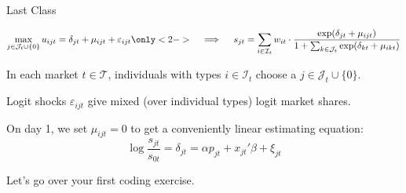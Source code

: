 \documentclass[aspectratio=169,t,11pt,table]{beamer}
\begin{document}

\begin{frame}{Last Class}
    \vspace{-\baselineskip}
    \begin{minipage}[c][4\baselineskip][c]{\textwidth}
        \begin{equation*}
            \max_{j \in \mathcal{J}_t \cup \{0\}} u_{ijt} = \delta_{jt} + \mu_{ijt} + \varepsilon_{ijt} \only<2->{\quad\implies\quad s_{jt} = \sum_{i \in \mathcal{I}_t} w_{it} \cdot \frac{\exp(\delta_{jt} + \mu_{ijt})}{1 + \sum_{k \in \mathcal{J}_t} \exp(\delta_{kt} + \mu_{ikt})}} 
        \end{equation*}
    \end{minipage}
    \vspace{-0.5\baselineskip}
    \begin{wideitemize}
        \item In each market $t \in \mathcal{T}$, individuals with types $i \in \mathcal{I}_t$ choose a $j \in \mathcal{J}_t \cup\{0\}$.
        \pause
        \item Logit shocks $\varepsilon_{ijt}$ give mixed (over individual types) logit market shares.
        \pause
        \item On day 1, we set $\mu_{ijt} = 0$ to get a conveniently linear estimating equation:
        \begin{equation*}
            \log\frac{s_{jt}}{s_{0t}} = \delta_{jt} = \alpha p_{jt} + x_{jt}'\beta + \xi_{jt}
        \end{equation*}
        \vspace{-\baselineskip}
        \pause
        \item Let's go over your first coding exercise.
    \end{wideitemize}
\end{frame}
\end{document}
